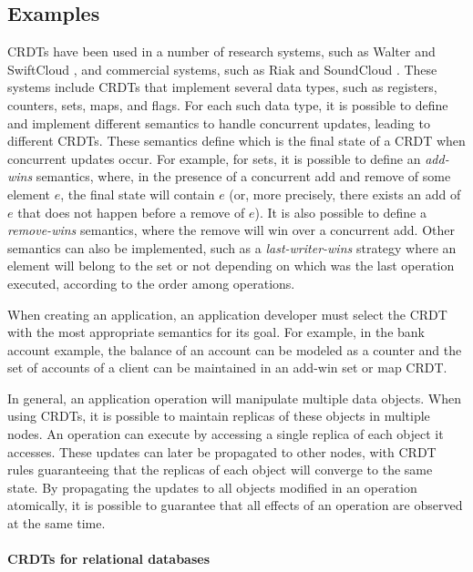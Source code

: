 \documentclass[11pt,dvipdfm]{article}
\begin{document}
\subsection{Examples}

CRDTs have been used in a number of research systems, such as Walter \cite{walter}
and SwiftCloud \cite{Zawirski15Write},
and commercial systems, such as Riak \cite{riak} and SoundCloud \cite{soundcloud}.
These systems include CRDTs that implement several data types, such as
registers, counters, sets, maps, and flags. For each such data type, it is possible to define and implement different semantics
to handle concurrent updates, leading to different CRDTs.
These semantics define which is the final state of a CRDT when
concurrent updates occur.
For example, for sets, it is possible to define an \emph{add-wins} semantics,
where, in the presence of a concurrent add and remove of some element $e$,
the final state will contain $e$ (or, more precisely, there exists an add of $e$
that does not happen before a remove of $e$).
It is also possible to define a \emph{remove-wins} semantics, where the remove will
win over a concurrent add.
Other semantics can also be implemented, such as a \emph{last-writer-wins} strategy where
an element will belong to the set or not depending on which was the last operation
executed, according to the order among operations.

When creating an application, an application developer must select the CRDT
with the most appropriate semantics for its goal.
For example, in the bank account example, the balance of an account can be modeled
as a counter and the set of accounts of a client can be maintained in an add-win set or map CRDT.

In general, an application operation will manipulate multiple data objects.
When using CRDTs, it is possible to maintain replicas of these objects in multiple nodes.
An operation can execute by accessing a single replica of each object it accesses.
These updates can later be propagated to other nodes, with CRDT rules guaranteeing
that the replicas of each object will converge to the same state.
By propagating the updates to all objects modified in an operation atomically,
it is possible to guarantee that all effects of an operation are observed at the
same time.

\paragraph{CRDTs for relational databases}
\end{document}
